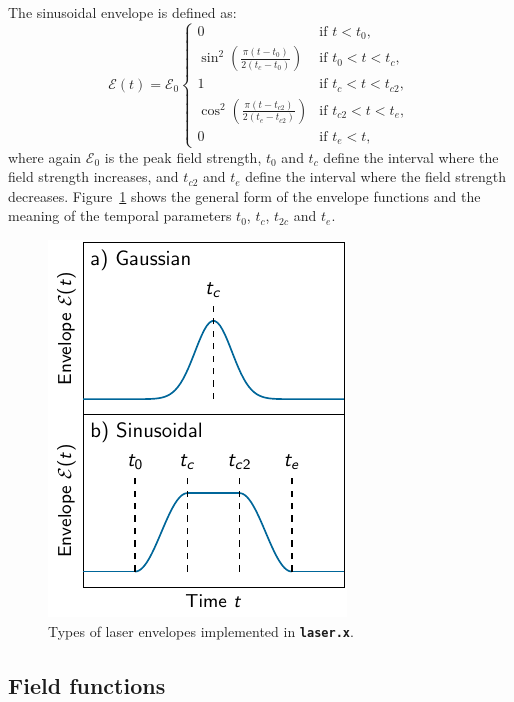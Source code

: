 \documentclass[a4paper,11pt,DIV=15,openany,twoside=false]{scrbook}
\newcommand{\ttt}[1]{\textbf{\texttt{#1}}}
\begin{document}
The sinusoidal envelope is defined as:
\begin{equation}
  \mathcal{E}(t)=\mathcal{E}_0
  \begin{cases}
    0                                                   &\text{if } t<t_0,\\
    \sin^2\left(\frac{\pi(t-t_0)}{2(t_c-t_0)}\right)      &\text{if } t_0<t<t_c,\\
    1                                                   &\text{if } t_c<t<t_{c2},\\
    \cos^2\left(\frac{\pi(t-t_{c2})}{2(t_e-t_{c2})}\right)      &\text{if } t_{c2}<t<t_e,\\
    0                                                   &\text{if } t_e<t,\label{eq:laser_sinus}
  \end{cases}
\end{equation}
where again $\mathcal{E}_0$ is the peak field strength, $t_0$ and $t_c$ define the interval where the field strength increases, and $t_{c2}$ and $t_e$ define the interval where the field strength decreases. Figure~\ref{fig:laser_envelope} shows the general form of the envelope functions and the meaning of the temporal parameters $t_0$, $t_c$, $t_{2c}$ and $t_e$.

\begin{figure}[h!]
  \centering
  \includegraphics[scale=1]{img/laser_envelope/laser_envelope.pdf}
  \caption{Types of laser envelopes implemented in \ttt{laser.x}.}
  \label{fig:laser_envelope}
\end{figure}

\subsection{Field functions}
\end{document}
